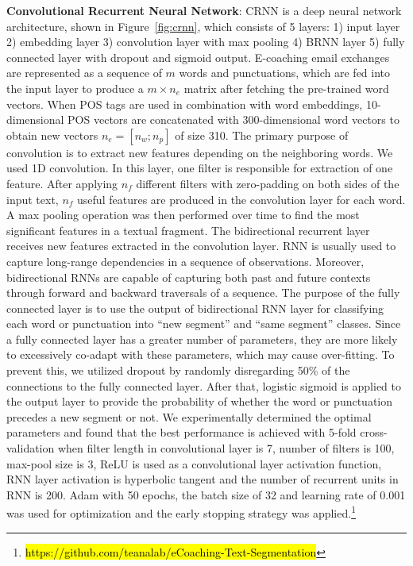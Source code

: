 \documentclass{amia}
\begin{document}
\textbf{Convolutional Recurrent Neural Network}: CRNN is a deep neural network architecture,\cite{treviso2017sentence} shown in Figure~\ref{fig:crnn}, which consists of 5 layers: 1) input layer 2) embedding layer 3) convolution layer with max pooling 4) BRNN layer 5) fully connected layer with dropout and sigmoid output. 
E-coaching email exchanges are represented as a sequence of $m$ words and punctuations, which are fed into the input layer to produce a $m \times n_e$ matrix after fetching the pre-trained word vectors. When POS tags are used in combination with word embeddings, 10-dimensional POS vectors are concatenated with 300-dimensional word vectors to obtain new vectors $n_e = [n_w;n_p]$ of size 310. The primary purpose of convolution is to extract new features depending on the neighboring words. We used 1D convolution. In this layer, one filter is responsible for extraction of one feature. After applying $n_f$ different filters with zero-padding on both sides of the input text, $n_f$ useful features are produced in the convolution layer for each word. A max pooling operation was then performed over time to find the most significant features in a textual fragment. The bidirectional recurrent layer receives new features extracted in the convolution layer. RNN is usually used to capture long-range dependencies in a sequence of observations. Moreover, bidirectional RNNs are capable of capturing both past and future contexts through forward and backward traversals of a sequence. The purpose of the fully connected layer is to use the output of bidirectional RNN layer for classifying each word or punctuation into ``new segment'' and ``same segment'' classes. Since a fully connected layer has a greater number of parameters, they are more likely to excessively co-adapt with these parameters, which may cause over-fitting. To prevent this, we utilized dropout by randomly disregarding 50\% of the connections to the fully connected layer. After that, logistic sigmoid is applied to the output layer to provide the probability of whether the word or punctuation precedes a new segment or not. We experimentally determined the optimal parameters and found that the best performance is achieved with 5-fold cross-validation when filter length in convolutional layer is 7, number of filters is 100, max-pool size is 3, ReLU is used as a convolutional layer activation function, RNN layer activation is hyperbolic tangent and the number of recurrent units in RNN is 200. Adam\cite{kingma2014adam} with 50 epochs, the batch size of 32 and learning rate of 0.001 was used for optimization and the early stopping strategy was applied.\footnote{\hl{https://github.com/teanalab/eCoaching-Text-Segmentation}}
\end{document}
